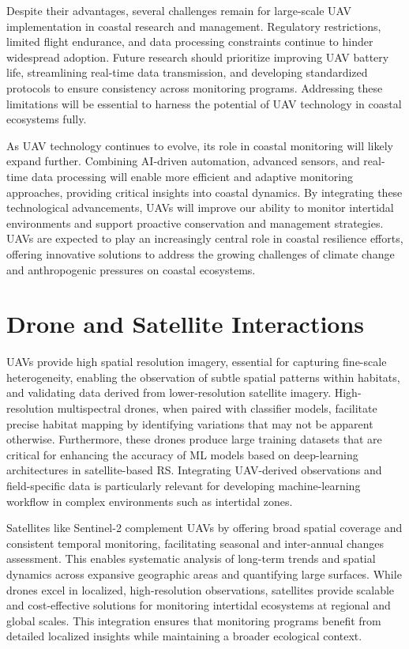 \documentclass[
  letterpaper,
  11pt,
  english,
  singlespacing,
  headsepline]{MastersDoctoralThesis}
\begin{document}
\begin{spacing}{1.5}
Despite their advantages, several challenges remain for large-scale UAV
implementation in coastal research and management. Regulatory
restrictions, limited flight endurance, and data processing constraints
continue to hinder widespread adoption. Future research should
prioritize improving UAV battery life, streamlining real-time data
transmission, and developing standardized protocols to ensure
consistency across monitoring programs. Addressing these limitations
will be essential to harness the potential of UAV technology in coastal
ecosystems fully.

As UAV technology continues to evolve, its role in coastal monitoring
will likely expand further. Combining AI-driven automation, advanced
sensors, and real-time data processing will enable more efficient and
adaptive monitoring approaches, providing critical insights into coastal
dynamics. By integrating these technological advancements, UAVs will
improve our ability to monitor intertidal environments and support
proactive conservation and management strategies. UAVs are expected to
play an increasingly central role in coastal resilience efforts,
offering innovative solutions to address the growing challenges of
climate change and anthropogenic pressures on coastal ecosystems.

\section{Drone and Satellite
Interactions}\label{drone-and-satellite-interactions}

UAVs provide high spatial resolution imagery, essential for capturing
fine-scale heterogeneity, enabling the observation of subtle spatial
patterns within habitats, and validating data derived from
lower-resolution satellite imagery. High-resolution multispectral
drones, when paired with classifier models, facilitate precise habitat
mapping by identifying variations that may not be apparent otherwise.
Furthermore, these drones produce large training datasets that are
critical for enhancing the accuracy of ML models based on deep-learning
architectures in satellite-based RS. Integrating UAV-derived
observations and field-specific data is particularly relevant for
developing machine-learning workflow in complex environments such as
intertidal zones.

Satellites like Sentinel-2 complement UAVs by offering broad spatial
coverage and consistent temporal monitoring, facilitating seasonal and
inter-annual changes assessment. This enables systematic analysis of
long-term trends and spatial dynamics across expansive geographic areas
and quantifying large surfaces. While drones excel in localized,
high-resolution observations, satellites provide scalable and
cost-effective solutions for monitoring intertidal ecosystems at
regional and global scales. This integration ensures that monitoring
programs benefit from detailed localized insights while maintaining a
broader ecological context.


\end{spacing}
\end{document}
